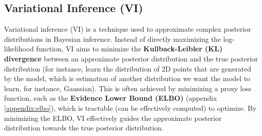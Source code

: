\subsection{Variational Inference (VI)}
\label{appendix:variational_inference}

Variational inference (VI) is a technique used to approximate complex posterior distributions in Bayesian inference. Instead of directly maximizing the log-likelihood function, VI aims to minimize the \textbf{Kullback-Leibler (KL) divergence} between an approximate posterior distribution and the true posterior distribution (for instance, learn the distribution of 2D points that are generated by the model, which is estimation of another distribution we want the model to learn, for instance, Gaussian). This is often achieved by minimizing a proxy loss function, such as the \textbf{Evidence Lower Bound (ELBO)} (appendix \ref{appendix:elbo}), which is tractable (can be effectively computed) to optimize. By minimizing the ELBO, VI effectively guides the approximate posterior distribution towards the true posterior distribution.